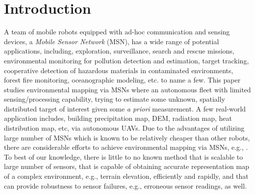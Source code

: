 \documentclass[letterpaper, 10 pt, conference]{ieeeconf}
\newcommand{\rood}[1]{{\color{red}{[#1]}}}
\begin{document}
\section{Introduction}
\label{sec:sec1}



A team of mobile robots equipped with ad-hoc communication and sensing devices, a \emph{Mobile Sensor Network} (MSN), has a wide range of potential applications, including, exploration, surveillance, search and rescue missions, environmental monitoring for pollution detection and estimation, target tracking, cooperative detection of hazardous materials in contaminated environments, forest fire monitoring, oceanographic modeling, etc. \cite{dhillon2003sensor,cortes_coverage_2004,yu2005real} to name a few.
This paper studies environmental mapping via MSNs where an autonomous fleet with limited sensing/processing capability, trying to estimate some unknown, spatially distributed target of interest given some \textit{a priori} measurement. A few real-world application includes, building precipitation map, DEM, radiation map, heat distribution map, etc, via autonomous UAVs. 
Due to the advantages of utilizing large number of MSNs which is known to be relatively cheaper than other robots, there are considerable efforts to achieve environmental mapping via MSNs, e.g., \cite{connor2016airborne,schwager2017multi,cortez2011information,julian2012distributed,lynch2008decentralized}. To best of our knowledge, there is little to no known method that is scalable to large number of sensors, that is capable of obtaining accurate representation map of a complex environment, e.g., terrain elevation, efficiently and rapidly, and that can provide robustness to sensor failures, e.g., erroneous sensor readings, as well.
\end{document}
